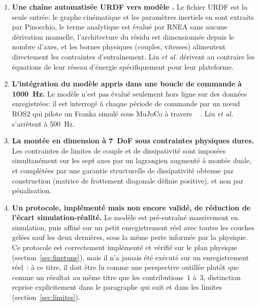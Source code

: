 \documentclass[a4paper, oneside]{article}
\newcommand{\code}[1]{%
    \mbox{\ttfamily\small%
        \detokenize{#1}%
    }%
}
\begin{document}
\begin{enumerate}
    \item \textbf{Une chaîne automatisée \og URDF vers modèle \fg{}.} Le
    fichier URDF est la seule entrée: le graphe cinématique et les paramètres
    inertiels en sont extraits par Pinocchio, le terme analytique est évalué par
    RNEA sans aucune dérivation manuelle, l'architecture du résidu est
    dimensionnée depuis le nombre d'axes, et les bornes physiques (couples,
    vitesses) alimentent directement les contraintes d'entraînement. Liu
    \emph{et al.} dérivent au contraire les équations de leur réseau
    d'énergie spécifiquement pour leur plateforme.

    \item \textbf{L'intégration du modèle appris dans une boucle de commande à
    \SI{1000}{Hz}.} Le modèle n'est pas évalué seulement hors ligne sur des données
    enregistrées: il est interrogé à chaque période de commande par un n\oe ud
    ROS2 qui pilote un Franka simulé sous MuJoCo à travers
    \code{ros2_control}. Liu \emph{et al.} s'arrêtent à \SI{500}{Hz}.

    \item \textbf{La montée en dimension à 7~DoF sous contraintes physiques
    dures.} Les contraintes de limites de couple et de dissipativité sont
    imposées simultanément sur les sept axes par un lagrangien augmenté à
    montée duale, et complétées par une garantie structurelle de dissipativité
    obtenue par construction (matrice de frottement diagonale définie
    positive), et non par pénalisation.

    \item \textbf{Un protocole, implémenté mais non encore validé, de
    réduction de l'écart simulation-réalité.} Le modèle est pré-entraîné
    massivement en simulation, puis affiné sur un petit enregistrement réel
    avec toutes les couches gelées sauf les deux dernières, sous la même perte
    informée par la physique. Ce protocole est correctement implémenté et
    vérifié sur le plan physique (section~\ref{sec:finetune}), mais il n'a
    jamais été exécuté sur un enregistrement réel~: à ce titre, il doit être
    lu comme une perspective outillée plutôt que comme un résultat au même
    titre que les contributions~1 à~3, distinction reprise explicitement dans
    le paragraphe qui suit et dans les limites (section~\ref{sec:limites}).
\end{enumerate}
\end{document}
